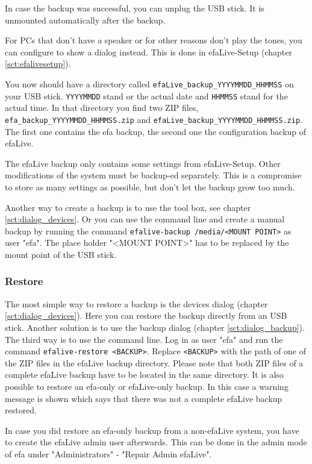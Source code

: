 \documentclass[a4paper,12pt,twoside]{article}
\begin{document}
In case the backup was successful, you can unplug the USB stick. It is
unmounted automatically after the backup.

For PCs that don't have a speaker or for other reasons
don't play the tones, you can configure to show a
dialog instead. This is done in efaLive-Setup (chapter \ref{sct:efalivesetup}).

You now should have a directory called
\texttt{efaLive\_backup\_YYYYMMDD\_HHMMSS} on your
USB stick. \texttt{YYYYMMDD} stand or the actual
date and \texttt{HHMMSS} stand for the actual
time. In that directory you find two ZIP files,
\texttt{efa\_backup\_YYYYMMDD\_HHMMSS.zip} and
\texttt{efaLive\_backup\_YYYYMMDD\_HHMMSS.zip}.
The first one contains the efa backup, the second one the configuration
backup of efaLive.

The efaLive backup only contains some settings from efaLive-Setup. Other
modifications of the system must be backup-ed separately. This is a
compromise to store as many settings as possible, but
don't let the backup grow too much.

Another way to create a backup is to use the tool box, see chapter 
\ref{sct:dialog_devices}. Or you can use the command line and create a manual 
backup by running the command \texttt{efalive-backup 
/media/{\textless}MOUNT POINT{\textgreater}} as user "efa". The place 
holder "{\textless}MOUNT POINT{\textgreater}" has to be replaced by the 
mount point of the USB stick.


\subsubsection{Restore}
\label{sct:restore}
The most simple way to restore a backup is the devices dialog (chapter
\ref{sct:dialog_devices}). Here you can restore the backup directly from an USB stick.
Another solution is to use the backup dialog (chapter \ref{sct:dialog_backup}). The third
way is to use the command line. Log in as user
"efa" and run the command
\texttt{efalive-restore {\textless}BACKUP{\textgreater}}. Replace
\texttt{{\textless}BACKUP{\textgreater}} with the
path of one of the ZIP files in the efaLive backup directory. Please
note that both ZIP files of a complete efaLive backup have to be located in the
same directory. It is also possible to restore an efa-only or efaLive-only backup.
In this case a warning message is shown which says that there was not a complete
efaLive backup restored.

In case you did restore an efa-only backup from a non-efaLive system, you have
to create the efaLive admin user afterwards. This can be done in the admin mode
of efa under "Administrators" - "Repair Admin efaLive".
\end{document}
